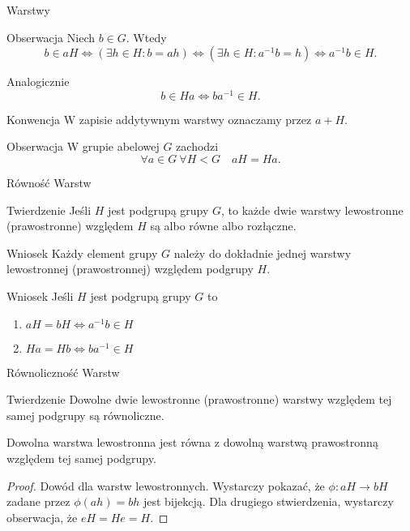 \documentclass{beamer}
\begin{document}
\begin{frame}{Warstwy}
    \begin{alertblock}{Obserwacja}
        Niech $b \in G$. Wtedy
        $$b \in aH\Leftrightarrow ( \exists h \in H : b=ah) \Leftrightarrow (\exists h \in H : a^{-1}b = h) \Leftrightarrow a^{-1}b \in H.$$

        Analogicznie
        $$b \in Ha \Leftrightarrow ba^{-1} \in H.$$
    \end{alertblock}
    \pause 
    \begin{alertblock}{Konwencja}
        W zapisie addytywnym warstwy oznaczamy przez $a + H$.
    \end{alertblock}

    \begin{alertblock}{Obserwacja}
        W grupie abelowej $G$ zachodzi 
        $$ \forall a \in G  \ \forall H < G \quad aH = Ha.$$
    \end{alertblock}
\end{frame}

\begin{frame}{Równość Warstw}
    \begin{block}{Twierdzenie}
        Jeśli $H$ jest podgrupą grupy $G$, to każde dwie warstwy lewostronne (prawostronne)
        względem $H$ są albo równe albo rozłączne. 
    \end{block}
    \pause
    \begin{alertblock}{Wniosek}
        Każdy element grupy $G$ należy do dokładnie jednej warstwy lewostronnej (prawostronnej)
        względem podgrupy $H$. 
    \end{alertblock}
    \begin{alertblock}{Wniosek}
        Jeśli $H$ jest podgrupą grupy $G$ to 
        \begin{enumerate}
            \item $aH = bH \Leftrightarrow a^{-1}b \in H$
            \item $Ha = Hb \Leftrightarrow ba^{-1} \in H$
        \end{enumerate}
    \end{alertblock}
\end{frame}

\begin{frame}{Równoliczność Warstw}
    \begin{block}{Twierdzenie}
        Dowolne dwie lewostronne (prawostronne) warstwy względem tej samej podgrupy są równoliczne.

        Dowolna warstwa lewostronna jest równa z dowolną warstwą prawostronną względem tej samej podgrupy.
    \end{block}
    \pause 
    \begin{proof}
        Dowód dla warstw lewostronnych.
        Wystarczy pokazać, że $\phi : aH \rightarrow bH$ zadane przez $\phi(ah) = bh$ jest bijekcją.
        Dla drugiego stwierdzenia, wystarczy obserwacja, że $e H = H e = H$.
    \end{proof}           
\end{frame}
\end{document}

